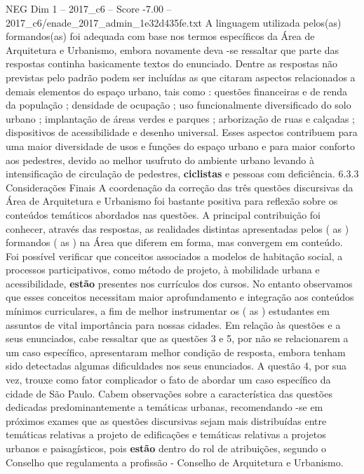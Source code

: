 \begin{textsample}{NEG Dim 1 – 2017\_c6 – Score -7.00 – 2017\_c6/enade\_2017\_admin\_1e32d435fe.txt}
A linguagem utilizada pelos(as) formandos(as) foi adequada com base nos termos específicos da Área de Arquitetura e Urbanismo, embora novamente deva -se ressaltar que parte das respostas continha basicamente textos do enunciado.
Dentre as respostas não previstas pelo padrão podem ser incluídas as que citaram aspectos relacionados a demais elementos do espaço urbano, tais como : questões financeiras e de renda da população ; densidade de ocupação ; uso funcionalmente diversificado do solo urbano ; implantação de áreas verdes e parques ; arborização de ruas e calçadas ; dispositivos de acessibilidade e desenho universal.
Esses aspectos contribuem para uma maior diversidade de usos e funções do espaço urbano e para maior conforto aos pedestres, devido ao melhor usufruto do ambiente urbano levando à intensificação de circulação de pedestres, \textbf{ciclistas} e pessoas com deficiência. 6.3.3 Considerações Finais A coordenação da correção das três questões discursivas da Área de Arquitetura e Urbanismo foi bastante positiva para reflexão sobre os conteúdos temáticos abordados nas questões.
A principal contribuição foi conhecer, através das respostas, as realidades distintas apresentadas pelos ( as ) formandos ( as ) na Área que diferem em forma, mas convergem em conteúdo.
Foi possível verificar que conceitos associados a modelos de habitação social, a processos participativos, como método de projeto, à mobilidade urbana e acessibilidade, \textbf{estão} presentes nos currículos dos cursos.
No entanto observamos que esses conceitos necessitam maior aprofundamento e integração aos conteúdos mínimos curriculares, a fim de melhor instrumentar os ( as ) estudantes em assuntos de vital importância para nossas cidades.
Em relação às questões e a seus enunciados, cabe ressaltar que as questões 3 e 5, por não se relacionarem a um caso específico, apresentaram melhor condição de resposta, embora tenham sido detectadas algumas dificuldades nos seus enunciados.
A questão 4, por sua vez, trouxe como fator complicador o fato de abordar um caso específico da cidade de São Paulo.
Cabem observações sobre a característica das questões dedicadas predominantemente a temáticas urbanas, recomendando -se em próximos exames que as questões discursivas sejam mais distribuídas entre temáticas relativas a projeto de edificações e temáticas relativas a projetos urbanos e paisagísticos, pois \textbf{estão} dentro do rol de atribuições, segundo o Conselho que regulamenta a profissão - Conselho de Arquitetura e Urbanismo.

\end{textsample}
